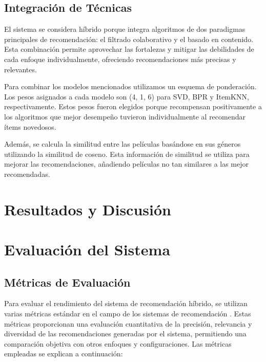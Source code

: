 \documentclass[runningheads]{llncs}
\begin{document}
\subsection{Integración de Técnicas}
El sistema se considera híbrido porque integra algoritmos de dos paradigmas principales de recomendación: el filtrado colaborativo y el basado en contenido. Esta combinación permite aprovechar las fortalezas y mitigar las debilidades de cada enfoque individualmente, ofreciendo recomendaciones más precisas y relevantes.

Para combinar los modelos mencionados utilizamos un esquema de ponderación. Los pesos asignados a cada modelo son (4, 1, 6) para SVD, BPR y ItemKNN, respectivamente. Estos pesos fueron elegidos porque recompensan positivamente a los algoritmos que mejor desempeño tuvieron individualmente al recomendar ítems novedosos.

Además, se calcula la similitud entre las películas basándose en sus géneros utilizando la similitud de coseno. Esta información de similitud se utiliza para mejorar las recomendaciones, añadiendo películas no tan similares a las mejor recomendadas.


\section{Resultados y Discusión}
    \section{Evaluación del Sistema}
        \subsection{Métricas de Evaluación}

        Para evaluar el rendimiento del sistema de recomendación híbrido, se utilizan varias métricas estándar en el campo de los sistemas de recomendación \cite{metrics}. Estas métricas proporcionan una evaluación cuantitativa de la precisión, relevancia y diversidad de las recomendaciones generadas por el sistema, permitiendo una comparación objetiva con otros enfoques y configuraciones.
        Las métricas empleadas se explican a continuación:
\end{document}
